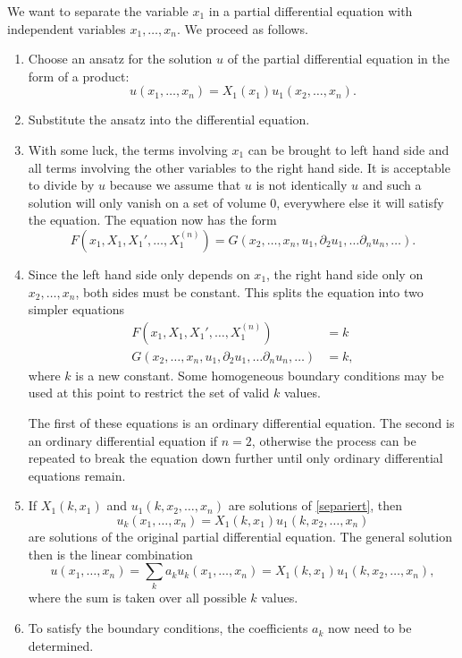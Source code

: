 We want to separate the variable $x_1$ in a partial differential
equation with independent variables $x_1,\dots,x_n$.
We proceed as follows.
\begin{enumerate}
\item
Choose an ansatz for the solution $u$ of the partial differential equation
in the form of a product:
\[
u(x_1,\dots,x_n)=X_1(x_1)u_1(x_2,\dots,x_n).
\]
\item
Substitute the ansatz into the differential equation.
\item
With some luck, the terms involving $x_1$ can be brought to
left hand side and all terms involving the other variables to
the right hand side.
It is acceptable to divide by $u$ because we assume that $u$ is not
identically $u$ and such a solution will only vanish on a set of
volume $0$, everywhere else it will satisfy the equation.
The equation now has the form
\[
F(x_1,X_1,X_1',\dots,X_1^{(n)})
=
G(x_2,\dots,x_n,u_1,\partial_2u_1,\dots\partial_nu_n,\dots).
\]
\item
Since the left hand side only depends on $x_1$, the right hand side
only on $x_2,\dots,x_n$, both sides must be constant.
This splits the equation into two simpler equations
\begin{equation}
\begin{aligned}
F(x_1, X_1,X_1',\dots, X_1^{(n)})&=k\\
G(x_2,\dots,x_n,u_1,\partial_2u_1,\dots\partial_nu_n,\dots)&=k,
\end{aligned}
\label{separiert}
\end{equation}
where $k$ is a new constant.
Some homogeneous boundary conditions may be used at this point to
restrict the set of valid $k$ values.

The first of these equations is an ordinary differential equation.
The second is an ordinary differential equation if $n=2$, otherwise
the process can be repeated to break the equation down further until
only ordinary differential equations remain.

\item
If
$X_1(k,x_1)$ and $u_1(k,x_2,\dots,x_n)$ are solutions of \eqref{separiert},
then
\[
u_k(x_1,\dots,x_n)=X_1(k,x_1)u_1(k,x_2,\dots,x_n)
\]
are solutions of the original partial differential equation.
The general solution then is the linear combination
\[
u(x_1,\dots,x_n)=
\sum_{k}
a_k
u_k(x_1,\dots,x_n)=X_1(k,x_1)u_1(k,x_2,\dots,x_n),
\]
where the sum is taken over all possible $k$ values.
\item
To satisfy the boundary conditions, the coefficients $a_k$ now need to
be determined.
\end{enumerate}
